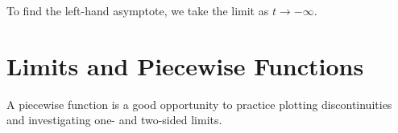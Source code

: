 \begin{maplegroup}
\begin{mapleinput}
\end{mapleinput}
\mapleresult
\begin{maplelatex}
\end{maplelatex}
\end{maplegroup}

To find the left-hand asymptote, we take the limit as $t \rightarrow -\infty$.

\begin{maplegroup}
\begin{mapleinput}
\end{mapleinput}
\mapleresult
\begin{maplelatex}
\end{maplelatex}
\end{maplegroup}

\section{Limits and Piecewise Functions}
\label{sec:limits_and_piecewise_functions}
A piecewise function is a good opportunity to practice plotting discontinuities and investigating one- and two-sided limits.
\begin{maplegroup}
\begin{mapleinput}
\end{mapleinput}
\mapleresult
\begin{maplelatex}
\end{maplelatex}
\end{maplegroup}

